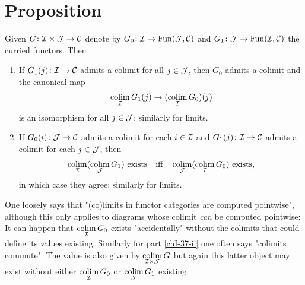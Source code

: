     \section{Proposition}\label{chI-37}
        Given $G \colon \mathcal{I} \times \mathcal{J} \to \mathcal{C}$ denote by $G_0 \colon \mathcal{I} \to \operatorname{Fun}(\mathcal{J}, \mathcal{C})$ and $G_1 \colon \mathcal{J} \to \operatorname{Fun}(\mathcal{I}, \mathcal{C})$ the curried functors. Then
        \begin{enumerate}[label=\roman*)]
            \item 
                If $G_1(j) \colon \mathcal{I} \to \mathcal{C}$ admits a colimit for all $j \in \mathcal{J}$, then $G_0$ admits a colimit and the canonical map
                \begin{equation*}
                    \operatorname*{colim}\limits_{\mathcal{I}} G_1(j) \to (\operatorname*{colim}\limits_{\mathcal{I}} G_0)(j)
                \end{equation*}
                is an isomorphism for all $j \in \mathcal{J}$; similarly for limits.\label{chI-37-i}
            \item 
                If $G_0(i) \colon \mathcal{J} \to \mathcal{C}$ admits a colimit for each $i \in \mathcal{I}$ and $G_1(j) \colon \mathcal{I} \to \mathcal{C}$ admits a colimit for each $j \in \mathcal{J}$, then
                \begin{equation*}
	                   \operatorname*{colim}\limits_{\mathcal{I}} (\operatorname*{colim}\limits_{\mathcal{J}} G_1) \text{ exists} \quad \text{iff} \quad \operatorname*{colim}\limits_{\mathcal{J}} (\operatorname*{colim}\limits_{\mathcal{I}} G_0) \text{ exists,}
                \end{equation*}
                in which case they agree; similarly for limits.\label{chI-37-ii}
        \end{enumerate}
        One loosely says that "(co)limits in functor categories are computed pointwise", although this only applies to diagrams whose colimit \emph{can} be computed pointwise: It can happen that $\operatorname*{colim}\limits_{\mathcal{I}} G_0$ exists "accidentally" without the colimits that could define its values existing. 
        Similarly for part \ref{chI-37-ii} one often says "colimits commute". The value is also given by $\operatorname*{colim}\limits_{\mathcal{I} \times \mathcal{J}} G$ but again this latter object may exist without either $\operatorname*{colim}\limits_{\mathcal{I}} G_0$ or $\operatorname*{colim}\limits_{\mathcal{J}} G_1$ existing.
        \smallskip

